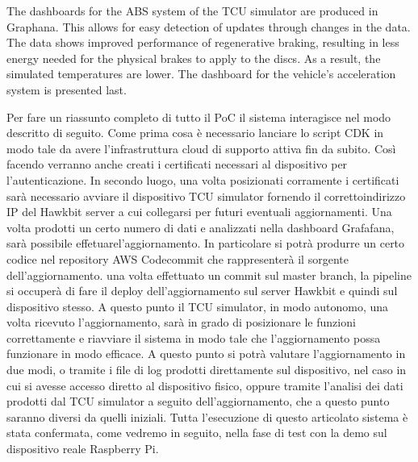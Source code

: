The dashboards for the ABS system of the TCU simulator are produced in Graphana. This allows for easy detection of updates through changes in the data. The data shows improved performance of regenerative braking, resulting in less energy needed for the physical brakes to apply to the discs. As a result, the simulated temperatures are lower. The dashboard for the vehicle's acceleration system is presented last.

Per fare un riassunto completo di tutto il PoC il sistema interagisce nel modo descritto di seguito. Come prima cosa è necessario lanciare lo script CDK in modo tale da avere l'infrastruttura cloud di supporto attiva fin da subito. Così facendo verranno anche creati i certificati necessari al dispositivo per l'autenticazione. In secondo luogo, una volta posizionati corramente i certificati sarà necessario avviare il dispositivo TCU simulator fornendo il correttoindirizzo IP del Hawkbit server a cui collegarsi per futuri eventuali aggiornamenti. Una volta prodotti un certo numero di dati e analizzati nella dashboard Grafafana, sarà possibile effetuarel'aggiornamento. In particolare si potrà produrre un certo codice nel repository AWS Codecommit che rappresenterà il sorgente dell'aggiornamento. una volta effettuato un commit sul master branch, la pipeline si occuperà di fare il deploy dell'aggiornamento sul server Hawkbit e quindi sul dispositivo stesso. A questo punto il TCU simulator, in modo autonomo, una volta ricevuto l'aggiornamento, sarà in grado di posizionare le funzioni correttamente e riavviare il sistema in modo tale che l'aggiornamento possa funzionare in modo efficace. A questo punto si potrà valutare l'aggiornamento in due modi, o tramite i file di log prodotti direttamente sul dispositivo, nel caso in cui si avesse accesso diretto al dispositivo fisico, oppure tramite l'analisi dei dati prodotti dal TCU simulator a seguito dell'aggiornamento, che a questo punto saranno diversi da quelli iniziali. Tutta l'esecuzione di questo articolato sistema è stata confermata, come vedremo in seguito, nella fase di test con la demo sul dispositivo reale Raspberry Pi.